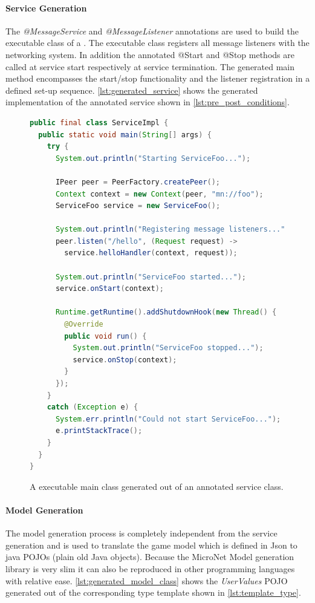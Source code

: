 \paragraph{Service Generation}

The \textit{@MessageService} and \textit{@MessageListener} annotations are used
to build the executable class of a \ms{}. The executable class registers all
message listeners with the networking system. In addition the annotated @Start
and @Stop methods are called at service start respectively at service
termination. The generated main method encompasses the start/stop functionality
and the listener registration in a defined set-up sequence.
\autoref{lst:generated_service} shows the generated implementation of the
annotated service shown in \autoref{lst:pre_post_conditions}.

\begin{figure}
\begin{lstlisting}[language=Java,firstnumber=1] 
public final class ServiceImpl {
  public static void main(String[] args) {
    try {
      System.out.println("Starting ServiceFoo...");

      IPeer peer = PeerFactory.createPeer();
      Context context = new Context(peer, "mn://foo");
      ServiceFoo service = new ServiceFoo();

      System.out.println("Registering message listeners...");
      peer.listen("/hello", (Request request) -> 
      	service.helloHandler(context, request));

      System.out.println("ServiceFoo started...");
      service.onStart(context);

      Runtime.getRuntime().addShutdownHook(new Thread() {
        @Override
        public void run() {
          System.out.println("ServiceFoo stopped...");
          service.onStop(context);
        }
      });
    }
    catch (Exception e) {
      System.err.println("Could not start ServiceFoo...");
      e.printStackTrace();
    }
  }
}
\end{lstlisting}
\caption{A executable \ms{} main class generated out of an annotated service
class.}
\label{lst:generated_service}
\end{figure}

\paragraph{Model Generation}

The model generation process is completely independent from the service
generation and is used to translate the game model which is defined in Json to
java POJOs (plain old Java objects). Because the MicroNet Model generation
library is very slim it can also be reproduced in other programming languages
with relative ease. \autoref{lst:generated_model_class} shows the
\textit{UserValues} POJO generated out of the corresponding type template shown
in \autoref{lst:template_type}.

